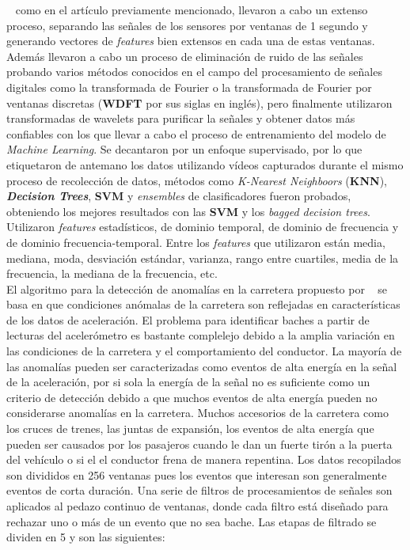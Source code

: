 ~\textcite{el2018towards} como en el artículo previamente mencionado, llevaron a cabo un extenso proceso, separando las señales de los sensores por
ventanas de 1 segundo y generando vectores de \emph{features} bien extensos en cada una de estas ventanas. Además llevaron a cabo un proceso de eliminación
de ruido de las señales probando varios métodos conocidos en el campo del procesamiento de señales digitales como la transformada de Fourier o la transformada de
Fourier por ventanas discretas (\textbf{WDFT} por sus siglas en inglés), pero finalmente utilizaron transformadas de wavelets para purificar la señales y obtener
datos más confiables con los que llevar a cabo el proceso de entrenamiento del modelo de \emph{Machine Learning}. Se decantaron por un enfoque supervisado, por
lo que etiquetaron de antemano los datos utilizando vídeos capturados durante el mismo proceso de recolección de datos, métodos como \emph{K-Nearest Neighboors}
(\textbf{KNN}), \emph{\textbf{Decision Trees}}, \textbf{SVM} y \emph{ensembles} de clasificadores fueron probados, obteniendo los mejores resultados con las
\textbf{SVM} y los \emph{bagged decision trees}. Utilizaron \emph{features} estadísticos, de dominio temporal, de dominio de frecuencia y de dominio
frecuencia-temporal. Entre los \emph{features} que utilizaron están media, mediana, moda, desviación estándar, varianza, rango entre cuartiles, media de la
frecuencia, la mediana de la frecuencia, etc.\\


El algoritmo para la detección de anomalías en la carretera propuesto por ~\textcite{eriksson2008pothole} se basa en que condiciones anómalas de la carretera
son reflejadas en características de los datos de aceleración. El problema para identificar baches a partir de lecturas del acelerómetro es bastante
complelejo debido a la amplia variación en las condiciones de la carretera y el comportamiento del conductor. La mayoría de las anomalías pueden ser
caracterizadas como eventos de alta energía en la señal de la aceleración, por si sola la energía de la señal no es suficiente como un criterio de
detección debido a que muchos eventos de alta energía pueden no considerarse anomalías en la carretera. Muchos accesorios de la carretera como
los cruces de trenes, las juntas de expansión, los eventos de alta energía que pueden ser causados por los pasajeros cuando le dan un fuerte
tirón a la puerta del vehículo o si el el conductor frena de manera repentina. Los datos recopilados son divididos en 256 ventanas pues
los eventos que interesan son generalmente eventos de corta duración. Una serie de filtros de procesamientos de señales son aplicados
al  pedazo continuo de ventanas, donde cada filtro está diseñado para rechazar uno o más de un evento que no sea bache.
Las etapas de filtrado se dividen en 5 y son las siguientes:

